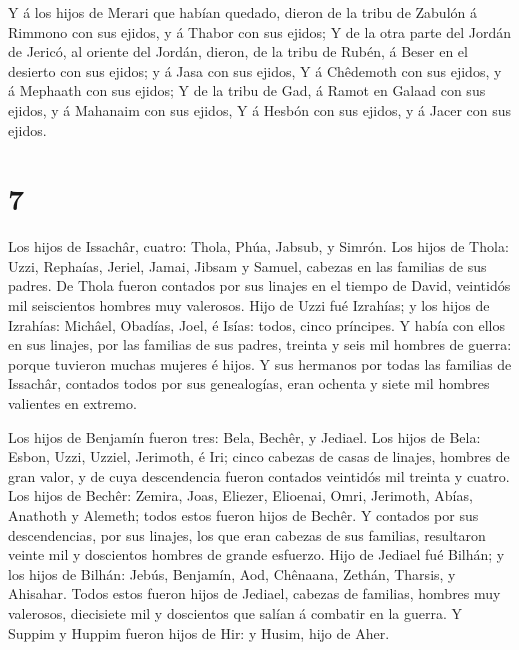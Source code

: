  Y á los hijos de Merari que habían quedado, dieron de la
tribu de Zabulón á Rimmono con sus ejidos, y á Thabor con sus ejidos;
 Y de la otra parte del Jordán de Jericó, al oriente del
Jordán, dieron, de la tribu de Rubén, á Beser en el desierto con sus
ejidos; y á Jasa con sus ejidos,  Y á Chêdemoth con sus
ejidos, y á Mephaath con sus ejidos;  Y de la tribu de Gad,
á Ramot en Galaad con sus ejidos, y á Mahanaim con sus ejidos,
 Y á Hesbón con sus ejidos, y á Jacer con sus ejidos.

\hypertarget{section-6}{%
\section{7}\label{section-6}}

 Los hijos de Issachâr, cuatro: Thola, Phúa, Jabsub, y
Simrón.  Los hijos de Thola: Uzzi, Rephaías, Jeriel, Jamai,
Jibsam y Samuel, cabezas en las familias de sus padres. De Thola fueron
contados por sus linajes en el tiempo de David, veintidós mil
seiscientos hombres muy valerosos.  Hijo de Uzzi fué
Izrahías; y los hijos de Izrahías: Michâel, Obadías, Joel, é Isías:
todos, cinco príncipes.  Y había con ellos en sus linajes,
por las familias de sus padres, treinta y seis mil hombres de guerra:
porque tuvieron muchas mujeres é hijos.  Y sus hermanos por
todas las familias de Issachâr, contados todos por sus genealogías, eran
ochenta y siete mil hombres valientes en extremo.

 Los hijos de Benjamín fueron tres: Bela, Bechêr, y Jediael.
 Los hijos de Bela: Esbon, Uzzi, Uzziel, Jerimoth, é Iri;
cinco cabezas de casas de linajes, hombres de gran valor, y de cuya
descendencia fueron contados veintidós mil treinta y cuatro.
 Los hijos de Bechêr: Zemira, Joas, Eliezer, Elioenai, Omri,
Jerimoth, Abías, Anathoth y Alemeth; todos estos fueron hijos de Bechêr.
 Y contados por sus descendencias, por sus linajes, los que
eran cabezas de sus familias, resultaron veinte mil y doscientos hombres
de grande esfuerzo.  Hijo de Jediael fué Bilhán; y los
hijos de Bilhán: Jebús, Benjamín, Aod, Chênaana, Zethán, Tharsis, y
Ahisahar.  Todos estos fueron hijos de Jediael, cabezas de
familias, hombres muy valerosos, diecisiete mil y doscientos que salían
á combatir en la guerra.  Y Suppim y Huppim fueron hijos de
Hir: y Husim, hijo de Aher.


